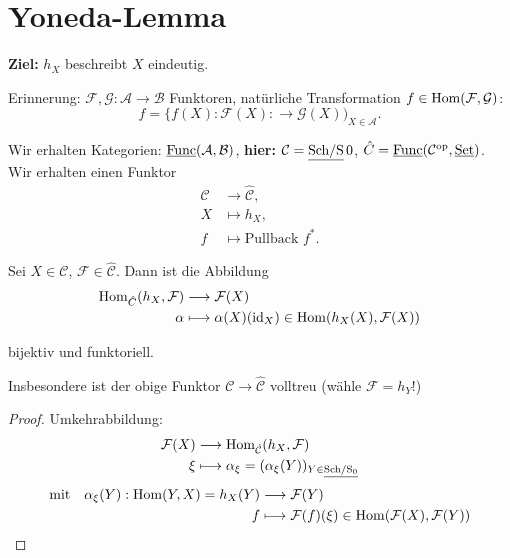 \section{Yoneda-Lemma}

\textbf{Ziel:} $h_{X}$ beschreibt $X$ eindeutig.

Erinnerung: $\mathcal{F},\mathcal{G}:\mathcal{A}\rightarrow\mathcal{B}$
Funktoren, natürliche Transformation $f\in\operatorname{\mathrm{Hom}}(\mathcal{F},\mathcal{G})$:
\[
  f=\{f(X):\mathcal{F}(X):\rightarrow\mathcal{G}(X))_{X\in\mathcal{A}}.
\]

Wir erhalten Kategorien: $\operatorname{\underline{Func}}(\mathcal{A},\mathcal{B})$, \textbf{hier:
}$\mathcal{C}=\operatorname{\underline{Sch/S}}0$, $\hat{C}=\operatorname{\underline{Func}}(\mathcal{C}^{\operatorname{op}},\operatorname{\underline{Set}})$.
Wir erhalten einen Funktor
\begin{align*}
  \mathcal{C} & \longrightarrow\hat{\mathcal{C}},\\
  X & \longmapsto h_{X},\\
  f & \longmapsto\text{Pullback }f^{\ast}.
\end{align*}

\begin{prop}[5]
  Sei $X\in\mathcal{C}$, $\mathcal{F}\in\hat{\mathcal{C}}$. Dann
  ist die Abbildung
  \begin{align*}
    \operatorname{\mathrm{Hom}}_{\hat{C}}(h_{X},\mathcal{F}) & \longrightarrow\mathcal{F}(X)\\
    \alpha & \longmapsto\alpha(X)(\operatorname{\mathrm{id}}_{X})\in\operatorname{\mathrm{Hom}}(h_{X}(X),\mathcal{F}(X))
  \end{align*}

  bijektiv und funktoriell.
\end{prop}

Insbesondere ist der obige Funktor $\mathcal{C}\rightarrow\hat{\mathcal{C}}$
volltreu (wähle $\mathcal{F}=h_{Y}$!)
\begin{proof}
  Umkehrabbildung:
  \begin{align*}
    \mathcal{F}(X) & \longrightarrow\operatorname{\mathrm{Hom}}_{\hat{\mathcal{C}}}(h_{X},\mathcal{F})\\
    \xi & \longmapsto\alpha_{\xi}=(\alpha_{\xi}(Y))_{Y\in\operatorname{\underline{Sch/S_{0}}}}
  \end{align*}
  \begin{align*}
    \text{mit}\quad\alpha_{\xi}(Y):\operatorname{\mathrm{Hom}}(Y,X)=h_{X}(Y) & \longrightarrow\mathcal{F}(Y)\\
    f & \longmapsto\mathcal{F}(f)(\xi)\in\operatorname{\mathrm{Hom}}(\mathcal{F}(X),\mathcal{F}(Y))
  \end{align*}
\end{proof}
